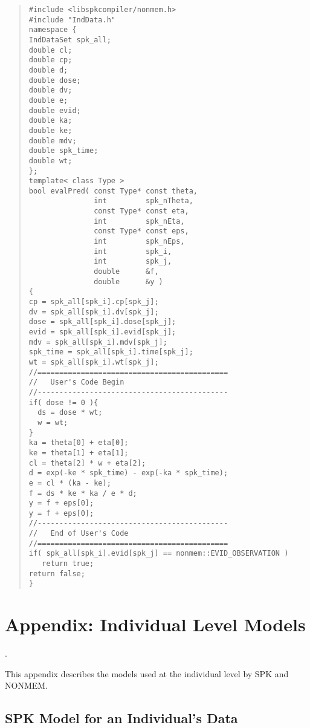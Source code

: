 \documentclass{article}
\begin{document}
\begin{quotation}
\noindent
\begin{verbatim}
#include <libspkcompiler/nonmem.h>
#include "IndData.h"
namespace {
IndDataSet spk_all;
double cl;
double cp;
double d;
double dose;
double dv;
double e;
double evid;
double ka;
double ke;
double mdv;
double spk_time;
double wt;
};
template< class Type >
bool evalPred( const Type* const theta, 
               int         spk_nTheta, 
               const Type* const eta, 
               int         spk_nEta, 
               const Type* const eps, 
               int         spk_nEps, 
               int         spk_i, 
               int         spk_j, 
               double      &f, 
               double      &y )
{
cp = spk_all[spk_i].cp[spk_j];
dv = spk_all[spk_i].dv[spk_j];
dose = spk_all[spk_i].dose[spk_j];
evid = spk_all[spk_i].evid[spk_j];
mdv = spk_all[spk_i].mdv[spk_j];
spk_time = spk_all[spk_i].time[spk_j];
wt = spk_all[spk_i].wt[spk_j];
//============================================
//   User's Code Begin
//--------------------------------------------
if( dose != 0 ){
  ds = dose * wt;
  w = wt;
}
ka = theta[0] + eta[0];
ke = theta[1] + eta[1];
cl = theta[2] * w + eta[2];
d = exp(-ke * spk_time) - exp(-ka * spk_time);
e = cl * (ka - ke);
f = ds * ke * ka / e * d;
y = f + eps[0];
y = f + eps[0];
//--------------------------------------------
//   End of User's Code
//============================================
if( spk_all[spk_i].evid[spk_j] == nonmem::EVID_OBSERVATION )
   return true;
return false;
}
\end{verbatim}
\end{quotation}

\newpage


%
\section{Appendix: Individual Level Models}
%

\label{App:IndLevelModels}.

This appendix describes the models used at the individual level 
by SPK and NONMEM.


\subsection{SPK Model for an Individual's Data}
\end{document}
